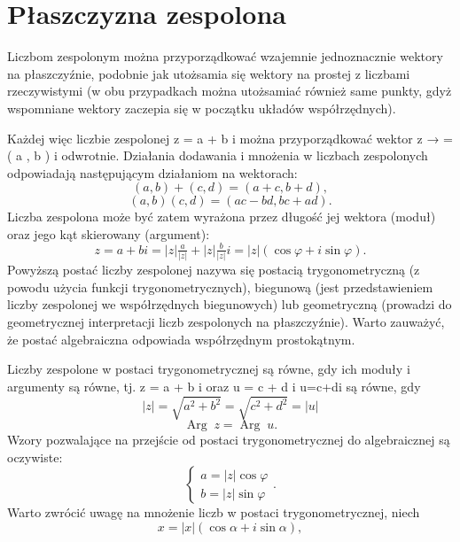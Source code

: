 \documentclass{article}
\begin{document}
\section{Płaszczyzna zespolona}
Liczbom zespolonym można przyporządkować wzajemnie jednoznacznie wektory na płaszczyźnie, podobnie jak utożsamia się wektory na prostej z liczbami rzeczywistymi (w obu przypadkach można utożsamiać również same punkty, gdyż wspomniane wektory zaczepia się w początku układów współrzędnych).

Każdej więc liczbie zespolonej z = a + b i można przyporządkować wektor z → = ( a , b ) i odwrotnie. Działania dodawania i mnożenia w liczbach zespolonych odpowiadają następującym działaniom na wektorach: 
$${ (a,b)+(c,d)=(a+c,b+d),}$$
$${ (a,b)(c,d)=(ac-bd,bc+ad).}$$
Liczba zespolona może być zatem wyrażona przez długość jej wektora (moduł) oraz jego kąt skierowany (argument): 
$${ z=a+bi=|z|{\tfrac {a}{|z|}}+|z|{\tfrac {b}{|z|}}i=|z|(\cos \varphi +i\sin \varphi ).}$$
Powyższą postać liczby zespolonej nazywa się postacią trygonometryczną (z powodu użycia funkcji trygonometrycznych), biegunową (jest przedstawieniem liczby zespolonej we współrzędnych biegunowych) lub geometryczną (prowadzi do geometrycznej interpretacji liczb zespolonych na płaszczyźnie). Warto zauważyć, że postać algebraiczna odpowiada współrzędnym prostokątnym.

Liczby zespolone w postaci trygonometrycznej są równe, gdy ich moduły i argumenty są równe, tj. z = a + b i  oraz u = c + d i  u=c+di są równe, gdy 
$$|z|={\sqrt  {a^{2}+b^{2}}}={\sqrt  {c^{2}+d^{2}}}=|u|$$
$${ \operatorname {Arg} \;z=\operatorname {Arg} \;u.}$$
Wzory pozwalające na przejście od postaci trygonometrycznej do algebraicznej są oczywiste: 
$${ {\begin{cases}a=|z|\cos \varphi \\b=|z|\sin \varphi \end{cases}}.}$$
Warto zwrócić uwagę na mnożenie liczb w postaci trygonometrycznej, niech 
$${ x=|x|(\cos \alpha +i\sin \alpha ),}$$
\end{document}
